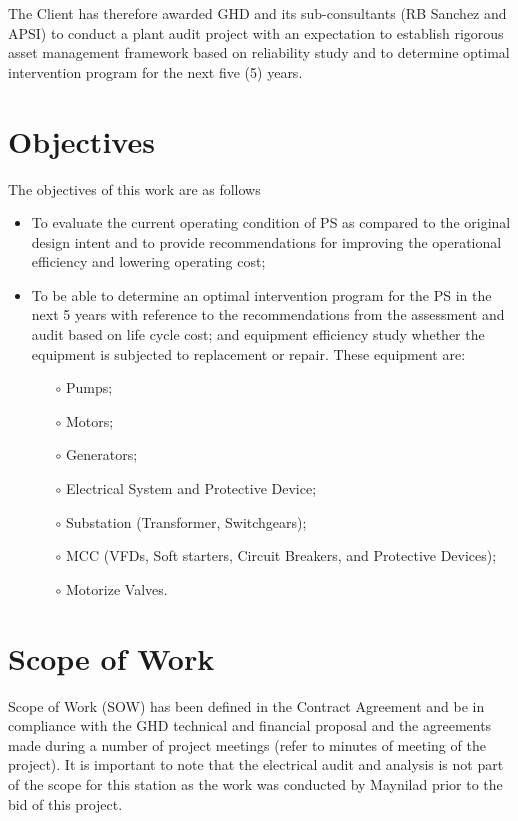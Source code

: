 The Client has therefore awarded GHD and its sub-consultants (RB Sanchez and APSI) to conduct a plant audit project with an expectation to establish rigorous asset management framework based on reliability study and to determine optimal intervention program for the next five (5) years.

\section{Objectives}
The objectives of this work are as follows
\begin{itemize}
	\item To evaluate the current operating condition of PS as compared to the original design intent and to provide recommendations for improving the operational efficiency and lowering operating cost;
	\item To be able to determine an optimal intervention program for the PS in the next 5 years with reference to the recommendations from the assessment and audit based on life cycle cost; and equipment efficiency study whether the equipment is subjected to replacement or repair. These equipment are:
	\begin{itemize}
		\item[$\circ$] Pumps;
		\item[$\circ$] Motors;
		\item[$\circ$] Generators;
		\item[$\circ$] Electrical System and Protective Device;
		\item[$\circ$] Substation (Transformer, Switchgears);
		\item[$\circ$] MCC (VFDs, Soft starters, Circuit Breakers, and Protective Devices);
		\item[$\circ$] Motorize Valves.	
	\end{itemize}
\end{itemize}

\section{Scope of Work}
Scope of Work (SOW) has been defined in the Contract Agreement and be in compliance with the GHD technical and financial proposal and the agreements made during a number of project meetings (refer to minutes of meeting of the project). It is important to note that the electrical audit and analysis is not part of the scope for this station as the work was conducted by Maynilad prior to the bid of this project.

